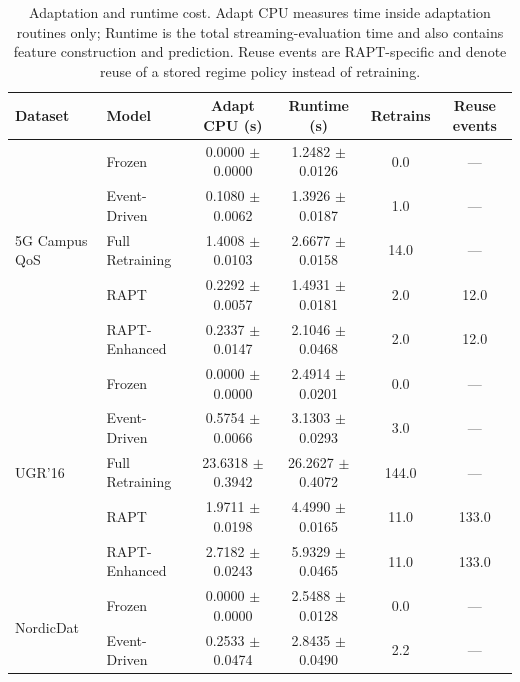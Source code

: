 \begin{table}[t]
\centering
\caption{Adaptation and runtime cost. Adapt CPU measures time inside adaptation
routines only; Runtime is the total streaming-evaluation time and also contains
feature construction and prediction. Reuse events are RAPT-specific and denote
reuse of a stored regime policy instead of retraining.}
\label{tab:results_cost}
\begin{tabular}{llcccc}
\toprule
Dataset & Model & Adapt CPU (s) & Runtime (s) & Retrains & Reuse events \\
\midrule
\multirow{5}{*}{5G Campus QoS}
 & Frozen          & 0.0000 $\pm$ 0.0000  & 1.2482 $\pm$ 0.0126 & 0.0  & --- \\
 & Event-Driven    & 0.1080 $\pm$ 0.0062  & 1.3926 $\pm$ 0.0187 & 1.0  & --- \\
 & Full Retraining & 1.4008 $\pm$ 0.0103  & 2.6677 $\pm$ 0.0158 & 14.0 & --- \\
 & RAPT            & 0.2292 $\pm$ 0.0057  & 1.4931 $\pm$ 0.0181 & 2.0  & 12.0 \\
 & RAPT-Enhanced   & 0.2337 $\pm$ 0.0147  & 2.1046 $\pm$ 0.0468 & 2.0  & 12.0 \\
\midrule
\multirow{5}{*}{UGR'16}
 & Frozen          & 0.0000 $\pm$ 0.0000  & 2.4914 $\pm$ 0.0201  & 0.0   & --- \\
 & Event-Driven    & 0.5754 $\pm$ 0.0066  & 3.1303 $\pm$ 0.0293  & 3.0   & --- \\
 & Full Retraining & 23.6318 $\pm$ 0.3942 & 26.2627 $\pm$ 0.4072 & 144.0 & --- \\
 & RAPT            & 1.9711 $\pm$ 0.0198  & 4.4990 $\pm$ 0.0165  & 11.0  & 133.0 \\
 & RAPT-Enhanced   & 2.7182 $\pm$ 0.0243  & 5.9329 $\pm$ 0.0465  & 11.0  & 133.0 \\
\midrule
\multirow{5}{*}{NordicDat}
 & Frozen          & 0.0000 $\pm$ 0.0000 & 2.5488 $\pm$ 0.0128 & 0.0  & --- \\
 & Event-Driven    & 0.2533 $\pm$ 0.0474 & 2.8435 $\pm$ 0.0490 & 2.2  & --- \\

\end{tabular}
\end{table}
